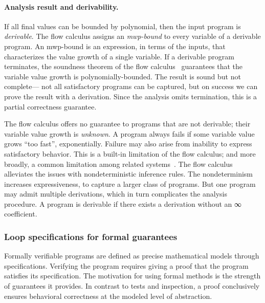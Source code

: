 \paragraph*{Analysis result and derivability.}
If all final values can be bounded by polynomial, then the input program is \emph{derivable}.
The flow calculus assigns an \emph{mwp-bound} to every variable of a derivable program.
An mwp-bound is an expression, in terms of the inputs, that characterizes the value growth of a single variable.
If a derivable program terminates, the soundness theorem of the flow calculus~\cite[p. 11]{jones2009} guarantees that the variable value growth is polynomially-bounded.
The result is sound but not complete---
not all satisfactory programs can be captured, but on success we can prove the result with a derivation.
Since the analysis omits termination, this is a partial correctness guarantee.

The flow calculus offers no guarantee to programs that are not derivable;
their variable value growth is \emph{unknown}.
A program always fails if some variable value grows \enquote{too fast}, \eg exponentially.
Failure may also arise from inability to express satisfactory behavior.
This is a built-in limitation of the flow calculus;
and more broadly, a common limitation among related systems~\cite[p. 2]{baillot2015}.
The flow calculus alleviates the issues with nondeterministic inference rules.
The nondeterminism increases expressiveness, to capture a larger class of programs.
But one program may admit multiple derivations, which in turn complicates the analysis procedure.
A program is derivable if there exists a derivation without an ∞ coefficient.

\subsubsection{Loop specifications for formal guarantees}
\label{subsec:specs}

Formally verifiable programs are defined as precise mathematical models through specifications.
Verifying the program requires giving a proof that the program satisfies its specification.
The motivation for using formal methods is the strength of guarantees it provides.
In contrast to tests and inspection, a proof conclusively ensures behavioral correctness at the modeled level of abstraction.

